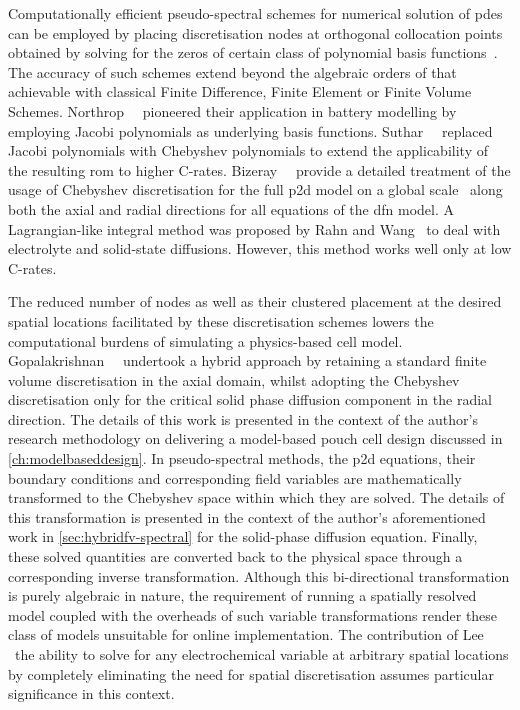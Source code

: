 Computationally    efficient     pseudo-spectral    schemes     for    numerical
solution   of   \glspl{pde}   can   be  employed   by   placing   discretisation
nodes    at    orthogonal    collocation     points    obtained    by    solving
for     the     zeros    of     certain     class     of    polynomial     basis
functions~\cite{Ferguson1971,Trefethen2000,Boyd2001,Shizgal2015,Dutykh2016}. The
accuracy of such  schemes extend beyond the algebraic orders  of that achievable
with  classical Finite  Difference,  Finite Element  or  Finite Volume  Schemes.
Northrop~\etal{}~\cite{Northrop2011}  pioneered  their  application  in  battery
modelling  by  employing  Jacobi  polynomials  as  underlying  basis  functions.
Suthar~\etal{}~\cite{Suthar2014}  replaced  Jacobi  polynomials  with  Chebyshev
polynomials to  extend the  applicability of the  resulting \gls{rom}  to higher
C-rates. Bizeray~\etal{}~\cite{Bizeray2015} provide a  detailed treatment of the
usage  of Chebyshev  discretisation for  the full  \gls{p2d} model  on a  global
scale \ie~along both the axial and radial directions for all equations of the
\gls{dfn}  model. A  Lagrangian-like integral  method was  proposed by  Rahn and
Wang~\cite{Rahn2013}  to  deal  with  electrolyte  and  solid-state  diffusions.
However, this method works well only at low C-rates.


The  reduced  number   of  nodes  as  well  as  their   clustered  placement  at
the  desired  spatial  locations  facilitated by  these  discretisation  schemes
lowers  the computational  burdens  of simulating  a  physics-based cell  model.
Gopalakrishnan~\etal{}~\cite{Gopalakrishnan2018} undertook a  hybrid approach by
retaining a  standard finite volume  discretisation in the axial  domain, whilst
adopting  the  Chebyshev  discretisation  only  for  the  critical  solid  phase
diffusion  component in  the  radial  direction. The  details  of  this work  is
presented in  the context of the  author's research methodology on  delivering a
model-based  pouch  cell  design  discussed  in  \cref{ch:modelbaseddesign}.  In
pseudo-spectral  methods, the  \gls{p2d}  equations,  their boundary  conditions
and  corresponding  field  variables   are  mathematically  transformed  to  the
Chebyshev   space  within   which  they   are  solved.   The  details   of  this
transformation  is  presented in  the  context  of the  author's  aforementioned
work  in \cref{sec:hybridfv-spectral}  for the  solid-phase diffusion  equation.
Finally,  these solved  quantities  are  converted back  to  the physical  space
through  a corresponding  inverse transformation.  Although this  bi-directional
transformation  is  purely  algebraic  in nature,  the  requirement  of  running
a  spatially  resolved  model  coupled  with  the  overheads  of  such  variable
transformations   render   these  class   of   models   unsuitable  for   online
implementation. The contribution  of Lee~\etal~\cite{Lee2012a,Lee2012} \ie~the
ability to solve for any electrochemical variable at arbitrary spatial locations
by completely eliminating the need for spatial discretisation assumes particular
significance in this context.


